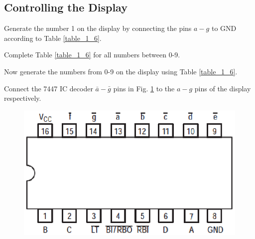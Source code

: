 \subsection{Controlling the Display}
\begin{problem}
	Generate the number 1 on the display by connecting the pins $a-g$ to GND according to Table \ref{table_1_6}.
	\end{problem}
%
\begin{problem}
	Complete Table \ref{table_1_6} for all numbers between 0-9.
\end{problem}
%
\begin{problem}
	Now generate the numbers from 0-9 on the display using Table \ref{table_1_6}.
\end{problem}
%
\begin{problem}
	Connect the 7447 IC decoder $\bar{a}-\bar{g}$ pins  in Fig. \ref{fig_1_9} to the $a-g$ pins of the display respectively.
\end{problem}
%
\begin{figure}[!ht]
\begin{center}
\includegraphics[width=\columnwidth]{./chapter1/figs/7447IC}
\end{center}
\label{fig_1_9}	
\end{figure}
%

